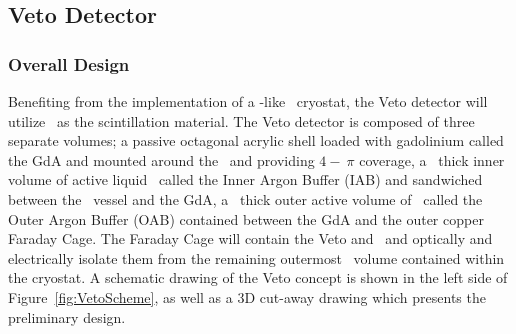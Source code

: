 \subsection{Veto Detector}
\label{sec:Veto}

\subsubsection{Overall Design}

Benefiting from the implementation of a \pDUNE-like \AAr\ cryostat, the Veto detector will utilize \AAr\ as the scintillation material. The Veto detector is composed of three separate volumes; a passive octagonal acrylic shell loaded with gadolinium called the GdA and mounted around the \TPC\ and providing $4-~\pi$ coverage, a  \DSkVetoIABThickness\ thick inner volume of active liquid \AAr\ called the Inner Argon Buffer (IAB) and sandwiched between the \TPC\ vessel and the GdA, a  \DSkVetoOABThickness\ thick outer active volume of \AAr\ called the Outer Argon Buffer (OAB) contained between the GdA and the outer copper Faraday Cage.  The Faraday Cage will contain the Veto and \TPC\ and optically and electrically isolate them from the remaining outermost \AAr\ volume contained within the cryostat.  A schematic drawing of the Veto concept is shown in the left side of Figure~\ref{fig:VetoScheme}, as well as a 3D cut-away drawing which presents the preliminary design.

